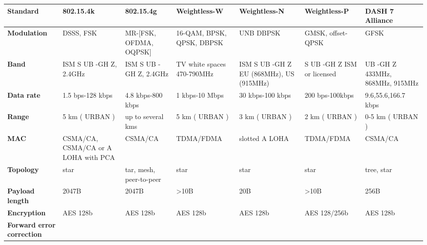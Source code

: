\begin{table}[h!]
\scriptsize
	\begin{tabulary}{\textwidth}{L|L|L|L|L|L|L}
	\textbf{Standard}                 & \textbf{802.15.4k}                  & \textbf{802.15.4g}      & \textbf{Weightless-W}      & \textbf{Weightless-N}                   & \textbf{Weightless-P}      & \textbf{DASH 7 Alliance}\\\hline
	\textbf{Modulation}               & DSSS, FSK                           & MR-[FSK, OFDMA, OQPSK]  & 16-QAM, BPSK, QPSK, DBPSK  & UNB DBPSK                               & GMSK, offset-QPSK          & GFSK\\\hline
	\textbf{Band}                     & ISM S UB -GH Z, 2.4GHz              & ISM S UB -GH Z, 2.4GHz  & TV white spaces 470-790MHz & ISM S UB -GH Z EU (868MHz), US (915MHz) & S UB -GH Z ISM or licensed & UB -GH Z 433MHz, 868MHz, 915MHz\\\hline
	\textbf{Data rate}                & 1.5 bps-128 kbps                    & 4.8 kbps-800 kbps       & 1 kbps-10 Mbps             & 30 kbps-100 kbps                        & 200 bps-100kbps            & 9.6,55.6,166.7 kbps\\\hline
	\textbf{Range}                    & 5 km ( URBAN )                      & up to several kms       & 5 km ( URBAN )             & 3 km ( URBAN )                          & 2 km ( URBAN )             & 0-5 km ( URBAN )\\\hline
	\textbf{MAC}                      & CSMA/CA, CSMA/CA or A LOHA with PCA & CSMA/CA                 & TDMA/FDMA                  & slotted A LOHA                          & TDMA/FDMA                  & CSMA/CA \\\hline
	\textbf{Topology}                 & star                                & tar, mesh, peer-to-peer & star                       & star                                    & star                       & tree, star\\\hline
	\textbf{Payload length}           & 2047B                               & 2047B                   & >10B                       & 20B                                     & >10B                       & 256B \\\hline
	\textbf{Encryption}               & AES 128b                            & AES 128b                & AES 128b                   & AES 128b                                & AES 128/256b               & AES 128b \\\hline
	\textbf{Forward error correction} & \ok                                 & \ok                     & \ok                        & \ko                                     & \ok                        & \ok\\\hline

\end{tabulary}
\end{table}
